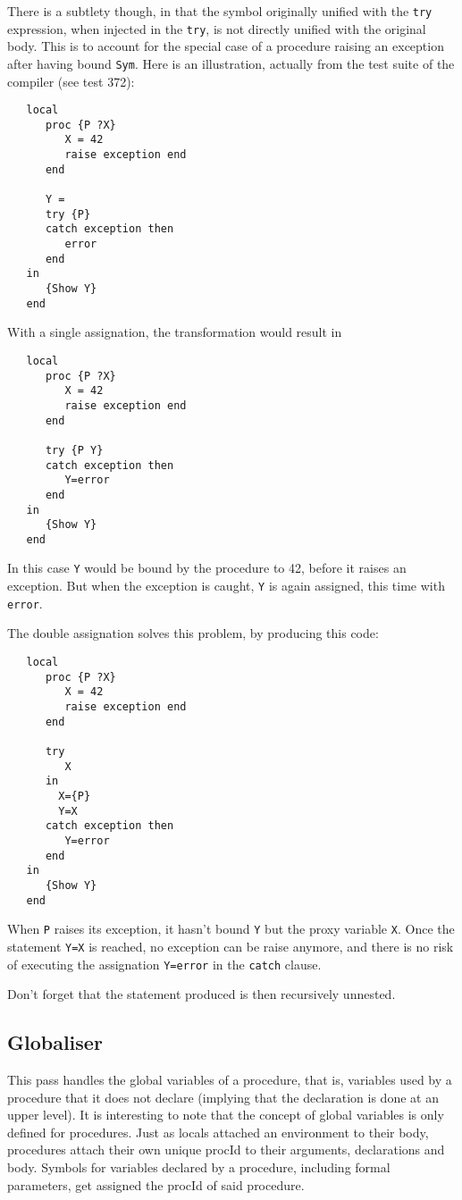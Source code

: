 \documentclass[a4paper]{memoir}
\begin{document}
There is a subtlety though, in that the symbol originally unified with the \lstinline!try!
expression, when injected in the \lstinline!try!, is not directly unified with
the original body. This is to account for the special case of a procedure
raising an exception after having bound \lstinline!Sym!. Here is an
illustration, actually from the test suite of the compiler (see test 372):
\begin{lstlisting}
   local
      proc {P ?X}
         X = 42
         raise exception end
      end
   
      Y =
      try {P}
      catch exception then
         error
      end
   in
      {Show Y}
   end
\end{lstlisting}
With a single assignation, the transformation would result in 
\begin{lstlisting}
   local
      proc {P ?X}
         X = 42
         raise exception end
      end
   
      try {P Y}
      catch exception then
         Y=error
      end
   in
      {Show Y}
   end
\end{lstlisting}


In this case \lstinline!Y! would be bound by
the procedure to 42, before it raises an exception. 
But when the exception is caught, \lstinline!Y! is again
assigned, this time with \lstinline!error!.

The double assignation solves this problem, by producing this code:
\begin{lstlisting}
   local
      proc {P ?X}
         X = 42
         raise exception end
      end
   
      try 
         X
      in 
        X={P}
        Y=X
      catch exception then
         Y=error
      end
   in
      {Show Y}
   end
\end{lstlisting}

When \lstinline!P! raises its exception, it hasn't bound \lstinline!Y! but the
proxy variable \lstinline!X!. Once the statement \lstinline!Y=X! is reached, no
exception can be raise anymore, and there is no risk of executing the
assignation \lstinline!Y=error! in the \lstinline!catch! clause.


Don't forget that the statement produced is then recursively unnested.




\subsection{Globaliser}\label{sec:arch:globaliser}            
This pass handles the global variables of a procedure, that is, variables used by a procedure that it does not declare (implying that the declaration is done at an upper level). It is interesting to note that the concept of global variables is only defined for procedures.
Just as locals attached an environment to their body, procedures attach their own unique procId to their arguments, declarations and body.
Symbols for variables declared by a procedure, including formal parameters, get assigned the procId of said procedure.
\end{document}
